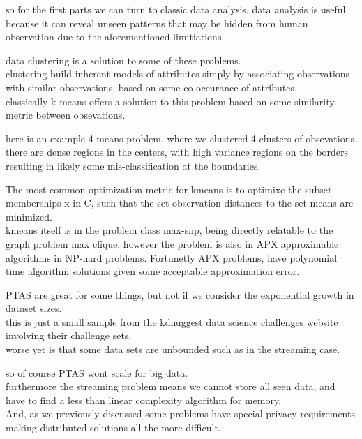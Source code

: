 \documentclass{beamer}
\begin{document}
\begin{frame}[plain]
so for the first parts we can turn to classic data analysis. data analysis is
useful because it can reveal unseen patterns that may be hidden from human
observation due to the aforementioned limitiations.
\end{frame}

\begin{frame}[plain]
data clustering is a solution to some of these problems. \\
clustering build
inherent models of attributes simply by associating observations with similar
observations, based on some co-occurance of attributes. \\
classically k-means offers a solution to this problem based on some similarity 
metric between obsevations.
\end{frame}

\begin{frame}[plain]
here is an example 4 means problem, where we clustered 4 clusters of obsevations.\\
there are dense regions in the centers, with high variance regions on the borders
resulting in likely some mis-classification at the boundaries.
\end{frame}

\begin{frame}[plain]
The most common optimization metric for kmeans is to optimixe the subset memberships
x in C, such that the set observation distances to the set means are minimized.\\
kmeans itself is in the problem class max-snp, being directly relatable to the
graph problem max clique, however the problem is also in APX approximable algorithms
in NP-hard problems. Fortunetly APX problems, have polynomial time algorithm
solutions given some acceptable approximation error.
\end{frame}

\begin{frame}[plain]
PTAS are great for some things, but not if we consider the exponential growth in
dataset sizes. \\
this is just a small sample from the kdnuggest data science
challenges website involving their challenge sets.\\
worse yet is that some data
sets are unbounded such as in the streaming case.
\end{frame}

\begin{frame}[plain]
so of course PTAS wont scale for big data.\\
furthermore the streaming problem means we cannot store all seen data, and have
to find a less than linear complexity algorithm for memory.\\
And, as we previously discussed some problems have special privacy requirements
making distributed solutions all the more difficult.
\end{frame}
\end{document}
